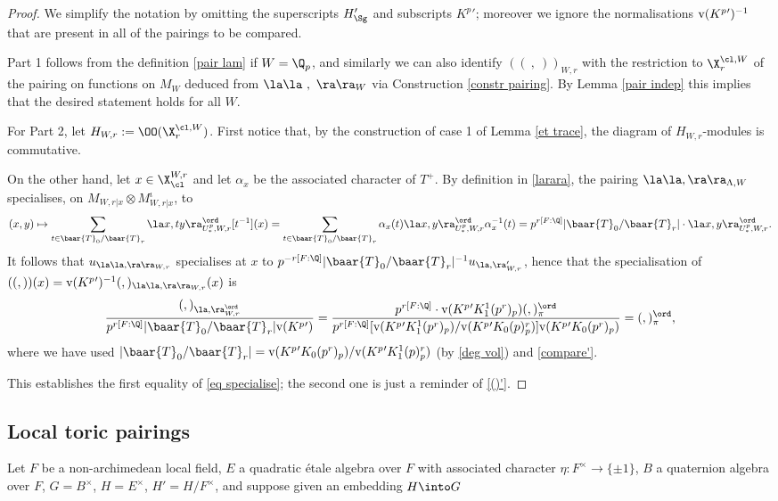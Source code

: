 \begin{proof}
We simplify the notation by omitting the superscripts $ {{H_{\Sg}'}}$ and subscripts $K^{p}{}'$; moreover we ignore the normalisations ${\rm v}(K^{p}{}')^{-1}$ that are present in all of the pairings to be compared.


Part 1 follows from the definition \eqref{pair lam} if $W=\Q_{p}$, and similarly we can also identify $((\ ,  \ ))_{W,r}$ with  the restriction to $\X_{r}^{\cl, W}$ of the pairing on functions on $M_{W}$ deduced from $\la\la\ , \ \ra\ra_{W}$ via
Construction \ref{constr pairing}. By Lemma \ref{pair indep} this implies that the desired statement holds for all $W$.


For Part 2, let $H_{W,r}:=\OO(\X_{r}^{\cl , W})$.
First  notice that, by the construction of case 1 of Lemma \ref{et trace}, the diagram  of $H_{W, r}$-modules
\beqq
{}
\eeqq
is commutative.

On the other hand, let $x\in \X_{\cl}^{W, r}$ and let $\alpha_{x}$ be the associated character of $T^{+}$. By  definition in \eqref{larara},
the pairing $\la  \la, \ra\ra_{\Lambda, W}$ specialises, on $M_{W,r|x}\otimes M_{W, r|x}^{\iota}$, to
$$(x, y)\mapsto \sum_{t\in \baar{T}_{0}/\baar{T}_{r}} \la x, ty\ra_{U_{*}^{p},W, r}^{\ord} [t^{-1}](x)= \sum_{t\in \baar{T}_{0}/\baar{T}_{r}} \alpha_{x}(t) \la x, y\ra_{U_{*}^{p},W, r}^{\ord} \alpha^{-1}_{x}(t) =p^{r[F:\Q]} |\baar{T}_{0}/\baar{T}_{r}|\cdot \la x, y\ra_{U_{*}^{p},W, r}^{\ord}.$$
It follows that $u_{\la\la, \ra\ra_{W, r}}$ specialises at $x$ to
 $p^{-r[F:\Q]}|\baar{T}_{0}/\baar{T}_{r}|^{-1}u_{\la, \ra'_{W,r}}$, hence that the specialisation of $((, ))(x)={\rm v}({K^{p}{}'})^{-1}(,)_{\la\la,\ra\ra_{W,r}}(x)$ is
$${  (,)_{\la,\ra_{W,r}^{\ord}}
\over p^{r[F:\Q]} |\baar{T}_{0}/\baar{T}_{r}|  {\rm v}({K^{p}{}'})}
 =
{p^{r[F:\Q]}
\cdot
{ {\rm v}(K^{p}{}' K_{1}^{1}(p^{r})_{p})}  (, )_{\pi}^{\ord}
\over {p^{r[F:\Q]} [{\rm v}(K^{p}{}' K_{1}^{1}(p^{r})_{p })/ {\rm v}(K^{p}{}' K_{0}(p)^{r}_{p }) ]   {\rm v}(K^{p}{}' K_{0}(p^{r})_{p})}}
= (, )_{\pi}^{\ord},$$
where we have used $|\baar{T}_{0}/\baar{T}_{r}|= {\rm v}(K^{p}{}' K_{0}(p^{r})_{p }) / {\rm v}(K^{p}{}' K_{1}^{1}(p)^{r}_{p }  )$ (by \eqref{deg vol}) and \eqref{compare'}.

This establishes the first equality of \eqref{eq specialise}; the second one is just a reminder of \eqref{()'}.
\end{proof}



\subsection{Local toric pairings} 
Let $F$ be a non-archimedean local field, $E$ a quadratic \'etale algebra over $F$ with associated character $\eta\colon F^{\times}\to\{\pm 1\}$, $B$ a quaternion algebra over $F$,  $G=B^{\times}$, $H=E^{\times}$, $H'=H/F^{\times}$, and suppose given an embedding $ H\into G$

